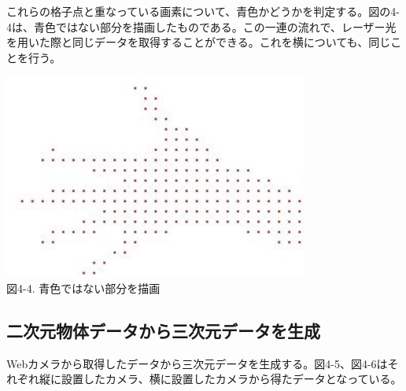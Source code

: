 これらの格子点と重なっている画素について、青色かどうかを判定する。図の4-4は、青色ではない部分を描画したものである。この一連の流れで、レーザー光を用いた際と同じデータを取得することができる。これを横についても、同じことを行う。

\begin{center}
  \includegraphics[width=10cm]{Simulator_data.eps} \\
 \vspace{1mm}
  図4-4. 青色ではない部分を描画
\end{center}



\newpage
\subsection{二次元物体データから三次元データを生成}
Webカメラから取得したデータから三次元データを生成する。図4-5、図4-6はそれぞれ縦に設置したカメラ、横に設置したカメラから得たデータとなっている。

